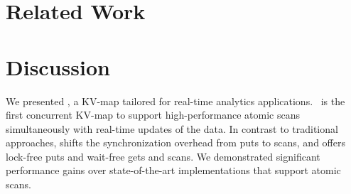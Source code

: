 \documentclass[10pt,numbers]{sigplanconf}
\begin{document}






\section{Related Work}
\label{sec:related}






\section{Discussion}
\label{sec:disc}

We presented {\kiwi}, a KV-map tailored for real-time analytics applications. \kiwi\ is the first
concurrent KV-map to support high-performance atomic scans simultaneously with real-time updates of the data.
In contrast to traditional approaches, {\kiwi} shifts the synchronization
overhead from puts to scans, and offers lock-free puts and wait-free gets and scans.
We demonstrated significant performance gains over state-of-the-art %
implementations that support atomic scans. 



%

%
\end{document}
